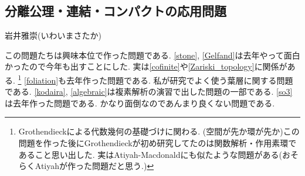 \documentclass[dvipdfmx,a4paper,11pt]{article}
\theoremstyle{definition}
\begin{document}
\newpage




	
	



\begin{center}
\section{分離公理・連結・コンパクトの応用問題}
\label{sec-compact_continue}
\end{center}

\begin{flushright}
 岩井雅崇(いわいまさたか)
\end{flushright}




この問題たちは興味本位で作った問題である.  %
\ref{stone}, \ref{Gelfand}は去年やって面白かったので今年も出すことにした. 実は\ref{cofinite}や\ref{Zariski_topology}に関係がある. \footnote{Grothendieckによる代数幾何の基礎づけに関わる. (空間が先か環が先か)この問題を作った後にGrothendieckが初め研究してたのは関数解析・作用素環であること思い出した. 実はAtiyah-Macdonaldにも似たような問題がある(おそらくAtiyahが作った問題だと思う.)} \ref{foliation}も去年作った問題である. 私が研究でよく使う葉層に関する問題である.
 \ref{kodaira}, \ref{algebraic}は複素解析の演習で出した問題の一部である. %
 \ref{so3}は去年作った問題である. かなり面倒なのであんまり良くない問題である. 
\end{document}
